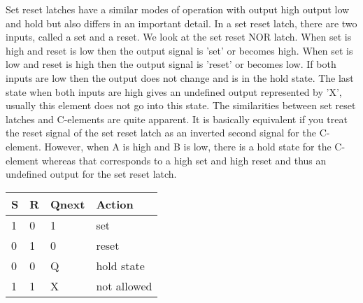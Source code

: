 \documentclass{article}
\begin{document}
\newline
Set reset latches have a similar modes of operation with output high output low and hold but also differs in an important detail.  In a set reset latch, there are two inputs, called a set and a reset.  We look at the set reset NOR latch.  When set is high and reset is low then the output signal is 'set' or becomes high.  When set is low and reset is high then the output signal is 'reset' or becomes low.  If both inputs are low then the output does not change and is in the hold state.  The last state when both inputs are high gives an undefined output represented by 'X', usually this element does not go into this state.  The similarities between set reset latches and C-elements are quite apparent.  It is basically equivalent if you treat the reset signal of the set reset latch as an inverted second signal for the C-element.  However, when A is high and B is low, there is a hold state for the C-element whereas that corresponds to a high set and high reset and thus an undefined output for the set reset latch.
\begin{center}

\begin{tabular}{|p{1.5cm}|p{1.5cm}|p{1.5cm}|p{2cm}| } 
 \hline
\textbf{S} & \textbf{R} & \textbf{Qnext} & \textbf{Action} \\
\hline
1 & 0 & 1 & set \\
\hline
0 & 1 & 0 & reset \\ 
\hline
0 & 0 & Q & hold state \\ 
\hline
1 & 1 & X & not allowed\\ 
\hline
\end{tabular}

\end{center}
\end{document}
